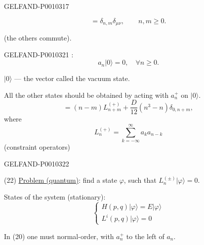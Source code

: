 \begin{GelfandAdjacentEvidence}{GELFAND-P001031}{7}


\begin{equation*}
[a_n^\mu,a_n^{+\nu}]=\delta_{n,m}\delta_{\mu\nu},\qquad n,m\geq0.
\tag{18}
\end{equation*}
\end{GelfandAdjacentEvidence}


(the others commute).


\begin{GelfandAdjacentEvidence}{GELFAND-P001032}{1}
:
\begin{equation*}
a_n|0\rangle=0,\quad\forall n\geq0.
\tag{19}
\end{equation*}

$|0\rangle$ --- the vector called the vacuum state.

All the other states should be obtained by acting with $a_n^+$ on $|0\rangle$.
\begin{equation*}
[L_n^{(+)},L_m^{(+)}]=(n-m)L_{n+m}^{(+)}
+\frac{D}{12}(n^3-n)\delta_{0,n+m},
\tag{20}
\end{equation*}
where
\begin{equation*}
L_n^{(+)}=\sum_{k=-\infty}^{\infty}a_k a_{n-k}
\tag{21}
\end{equation*}
(constraint operators)
\end{GelfandAdjacentEvidence}
\begin{GelfandAdjacentEvidence}{GELFAND-P001032}{2}


(22) \underline{Problem (quantum)}: find a state $\varphi$,
such that $L_n^{(\pm)}|\varphi\rangle=0$.

States of the system (stationary):
\begin{equation*}
\begin{cases}
H(p,q)|\varphi\rangle=E|\varphi\rangle\\
L^i(p,q)|\varphi\rangle=0
\end{cases}
\tag{23}
\end{equation*}

In (20) one must normal-order, with $a_n^+$ to the left of $a_n$.
\end{GelfandAdjacentEvidence}
